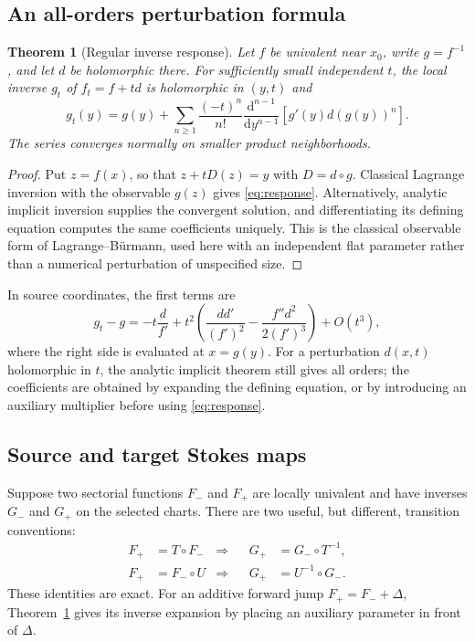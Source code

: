 \documentclass[11pt,a4paper]{article}
\numberwithin{equation}{section}
\newtheorem{theorem}{Theorem}[section]
\theoremstyle{definition}
\theoremstyle{remark}\newtheorem{remark}[theorem]{Remark}
\begin{document}
\subsection{An all-orders perturbation formula}
\begin{theorem}[Regular inverse response]\label{thm:response}
Let $f$ be univalent near $x_0$, write $g=f^{-1}$, and let $d$ be
holomorphic there. For sufficiently small independent $t$, the local
inverse $g_t$ of $f_t=f+td$ is holomorphic in $(y,t)$ and
\begin{equation}\label{eq:response}
 g_t(y)=g(y)+\sum_{n\ge1}\frac{(-t)^n}{n!}
 \frac{\mathrm d^{n-1}}{\mathrm dy^{n-1}}
 \left[g'(y)d(g(y))^n\right].
\end{equation}
The series converges normally on smaller product neighborhoods.
\end{theorem}
\begin{proof}
Put $z=f(x)$, so that $z+tD(z)=y$ with $D=d\circ g$. Classical
Lagrange inversion with the observable $g(z)$ gives
\eqref{eq:response}. Alternatively, analytic implicit inversion supplies
the convergent solution, and differentiating its defining equation
computes the same coefficients uniquely. This is the classical
observable form of Lagrange--B\"urmann, used here with an independent
flat parameter rather than a numerical perturbation of unspecified size.
\end{proof}
In source coordinates, the first terms are
\begin{equation}\label{eq:response-two}
 g_t-g=-t\frac{d}{f'}+
 t^2\left(\frac{dd'}{(f')^2}-\frac{f''d^2}{2(f')^3}\right)+O(t^3),
\end{equation}
where the right side is evaluated at $x=g(y)$. For a perturbation
$d(x,t)$ holomorphic in $t$, the analytic implicit theorem still gives
all orders; the coefficients are obtained by expanding the defining
equation, or by introducing an auxiliary multiplier before using
\eqref{eq:response}.

\subsection{Source and target Stokes maps}
Suppose two sectorial functions $F_-$ and $F_+$ are locally univalent
and have inverses $G_-$ and $G_+$ on the selected charts. There are two
useful, but different, transition conventions:
\begin{align}
 F_+&=T\circ F_- &\Longrightarrow&& G_+&=G_-\circ T^{-1},
       \label{eq:target-transition}\\
 F_+&=F_-\circ U &\Longrightarrow&& G_+&=U^{-1}\circ G_-.
       \label{eq:source-transition}
\end{align}
These identities are exact. For an additive forward jump
$F_+=F_-+\Delta$, Theorem~\ref{thm:response} gives its inverse expansion
by placing an auxiliary parameter in front of $\Delta$.
\end{document}
